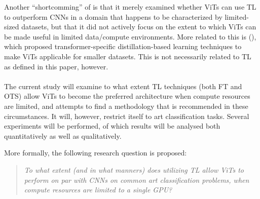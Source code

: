 Another ``shortcomming'' of \citeauthor{matsoukas2021time} is that it merely examined whether ViTs can use TL to outperform CNNs in a domain that happens to be characterized by limited-sized datasets, but that it did not actively focus on the extent to which ViTs can be made useful in limited data/compute environments. More related to this is \citeauthor{touvron2021training} (\citeyear{touvron2021training}), which proposed transformer-specific distillation-based learning techniques to make ViTs applicable for smaller datasets. This is not necessarily related to TL as defined in this paper, however.
\\\\
The current study will examine to what extent TL techniques (both FT and OTS) allow ViTs to become the preferred architecture when compute resources are limited, and attempts to find a methodology that is recommended in these circumstances. It will, however, restrict itself to art classification tasks. Several experiments will be performed, of which results will be analysed both quantitatively as well as qualitatively.


More formally, the following research question is proposed: \begin{quote}\textit{To what extent (and in what manners) does utilizing TL allow ViTs to perform on par with CNNs on common art classification problems, when compute resources are limited to a single GPU?}\end{quote}
